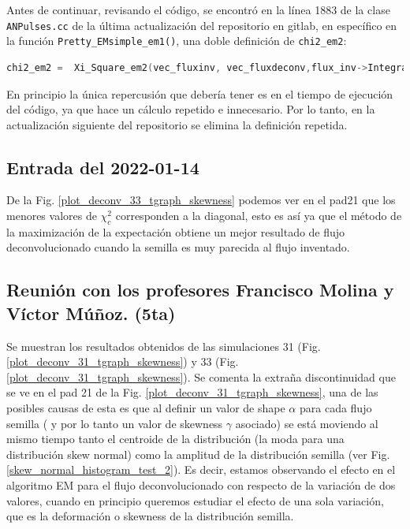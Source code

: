 \documentclass[11pt,letterpaper]{article}
\begin{document}
Antes de continuar, revisando el código, se encontró en la línea 1883 de la clase \verb|ANPulses.cc| de la última actualización del repositorio en gitlab, en específico en la función \verb|Pretty_EMsimple_em1()|, una doble definición de \verb|chi2_em2|:

\begin{lstlisting}[language=c++]
	 chi2_em2 =  Xi_Square_em2(vec_fluxinv, vec_fluxdeconv,flux_inv->Integral() , flux_inv->GetNbinsX());chi2_em2 =  Xi_Square_em2(vec_fluxinv, vec_fluxdeconv,flux_deconv->Integral() , flux_inv->GetNbinsX());
\end{lstlisting}

En  principio la única repercusión que debería tener es en el tiempo de ejecución del código, ya que hace un cálculo repetido e innecesario. Por lo tanto, en la actualización siguiente del repositorio se elimina la definición repetida.

\subsection*{Entrada del 2022-01-14}

De la Fig. \ref{plot_deconv_33_tgraph_skewness} podemos ver en el pad21 que los menores valores de $\chi_c^2$ corresponden a la diagonal, esto es así ya que el método de la maximización de la expectación obtiene un mejor resultado de flujo deconvolucionado cuando la semilla es muy parecida al flujo inventado.

\subsection*{Reunión con los profesores Francisco Molina y Víctor Múñoz. (5ta)} 

Se muestran los resultados obtenidos de las simulaciones 31 (Fig. \ref{plot_deconv_31_tgraph_skewness}) y 33 (Fig. \ref{plot_deconv_31_tgraph_skewness}). Se comenta la extraña discontinuidad que se ve en el pad 21 de la Fig. \ref{plot_deconv_31_tgraph_skewness}, una de las posibles causas de esta es que al definir un valor de shape $\alpha$ para cada flujo semilla ( y por lo tanto un valor de skewness $\gamma$ asociado) se está moviendo al mismo tiempo tanto el centroide de la distribución (la moda para una distribución skew normal) como la amplitud de la distribución semilla (ver Fig. \ref{skew_normal_histogram_test_2}). Es decir, estamos observando el efecto en el algoritmo EM para el flujo deconvolucionado con respecto de la variación de dos valores, cuando en principio queremos estudiar el efecto de una sola variación, que es la deformación o skewness de la distribución semilla.
\end{document}
